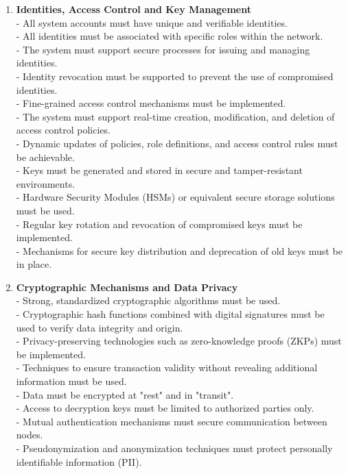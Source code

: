 \begin{enumerate}[label=(\arabic*)]	
	\item\textbf{Identities, Access Control and Key Management}\\
	- All system accounts must have unique and verifiable identities.\\
	- All identities must be associated with specific roles within the network.\\
	- The system must support secure processes for issuing and managing identities.\\
	- Identity revocation must be supported to prevent the use of compromised identities.\\
	- Fine-grained access control mechanisms must be implemented.\\
	- The system must support real-time creation, modification, and deletion of access control policies.\\
	- Dynamic updates of policies, role definitions, and access control rules must be achievable.\\
	- Keys must be generated and stored in secure and tamper-resistant environments.\\
	- Hardware Security Modules (HSMs) or equivalent secure storage solutions must be used.\\
	- Regular key rotation and revocation of compromised keys must be implemented.\\
	- Mechanisms for secure key distribution and deprecation of old keys must be in place.\\
	
	\item\textbf{Cryptographic Mechanisms and Data Privacy}\\
	- Strong, standardized cryptographic algorithms must be used.\\
	- Cryptographic hash functions combined with digital signatures must be used to verify data integrity and origin.\\
	- Privacy-preserving technologies such as zero-knowledge proofs (ZKPs) must be implemented.\\
	- Techniques to ensure transaction validity without revealing additional information must be used.\\ 
	- Data must be encrypted at "rest" and in "transit".\\
	- Access to decryption keys must be limited to authorized parties only.\\
	- Mutual authentication mechanisms must secure communication between nodes.\\
	- Pseudonymization and anonymization techniques must protect personally identifiable information (PII).\\
	

\end{enumerate}
